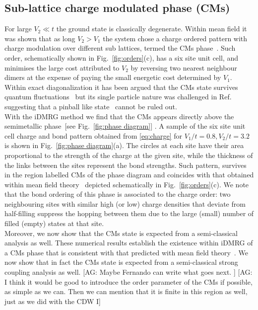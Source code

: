 \documentclass[aps,prx,10pt,twocolumn,floatfix,superscriptaddress,showpacs,numerical,footinbib]{revtex4-1}
\newcommand{\noteAG}[1]{{\color{blue} [AG: #1]}}
\begin{document}
\subsection{Sub-lattice charge modulated phase (CMs)}
%
For large $V_{2}\ll t$ the ground state is classically degenerate. 
%
Within mean field it was shown that as long $V_{2}>V_{1}$
the system chose a charge ordered pattern with charge modulation over different sub lattices, termed the CMs phase~\cite{GCC13}.
%
Such order, schematically shown in Fig.~\ref{fig:orders}(c), has a six site unit cell, and minimises the large cost
attributed to $V_{2}$ by reversing two nearest neighbour dimers at the expense of paying the small energetic cost
determined by $V_{1}$.
%
Within exact diagonalization it has been argued that the CMs state survives quantum fluctuations~\cite{GGNVC13,DH14,DCH14} 
but its single particle nature was challenged in Ref.~ suggesting that a pinball like state~\cite{HF06,MRF13} cannot be ruled out.\\
%
With the iDMRG method we find that the CMs appears directly above the semimetallic phase~[see Fig.~\ref{fig:phase diagram}] .
%
A sample of the six site unit cell charge and bond pattern obtained from \eqref{eq:charge} for $V_1/t = 0.8, V_2/t = 3.2 $ is shown in Fig.~\ref{fig:phase diagram}(a).
%
The circles at each site have their area proportional to the strength of the charge at the given site, while the thickness of the links between the sites
represent the bond strengths.
%
Such pattern, survives in the region labelled CMs of the phase diagram and coincides with that obtained within mean field theory~\cite{GCC13} 
depicted schematically in Fig.~\ref{fig:orders}(c).
%
We note that the bond ordering of this phase is associated to the charge order: two neighbouring sites with similar high (or low) charge densities
that deviate from half-filling suppress the hopping between them due to the large (small) number of filled (empty) states at that site. \\

% 
Moreover, we now show that the CMs state is expected from a semi-classical analysis as well.
%
These numerical results establish the existence within iDMRG of a CMs phase that is consistent with that predicted with mean field theory~\cite{GCC13}.
% 
We now show that in fact the CMs state is expected from a semi-classical strong coupling analysis as well.
%
\noteAG{Maybe Fernando can write what goes next. } 
\noteAG{I think it would be good to introduce the order parameter of the CMs if possible, as simple as we can. Then we can mention that it is finite in
this region as well, just as we did with the CDW I}
\end{document}
